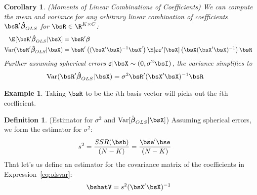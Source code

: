 \documentclass[12pt]{article}
\theoremstyle{plain}
\newtheorem{cor}[thm]{Corollary}
\theoremstyle{definition}
\newtheorem{defn}[thm]{Definition}
\newtheorem{ex}[thm]{Example}
\theoremstyle{remark}
\newcommand{\bsvarepsilon}{\boldsymbol{\varepsilon}}
\newcommand{\bsbeta}{\boldsymbol{\beta}}
\newcommand{\bshatbeta}{\boldsymbol{\hat{\beta}}}
\newcommand{\Var}{\operatorname{Var}}
\begin{document}
\clearpage
\begin{cor}\emph{(Moments of Linear Combinations of Coefficients)}
\label{cor:coeffmoments}
We can compute the mean and variance for any arbitrary linear
combination of coefficients $\bsR'\bshatbeta_{OLS}$ for
$\bsR\in\R^{K\times C}$:
\begin{align*}
  \E[\bsR'\bshatbeta_{OLS}|\bsX]
  &= \bsR'\bsbeta \\
  \Var(\bsR'\bshatbeta_{OLS}|\bsX)
  &=
  \bsR'\left((\bsX'\bsX)^{-1}\bsX'\right)
  \E[\bsvarepsilon\bsvarepsilon' |\bsX]
  \left(\bsX(\bsX'\bsX)^{-1}\right) \bsR
\end{align*}
Further assuming spherical errors
$\bsvarepsilon|\bsX\sim (0,\sigma^2\bsI)$, the variance simplifies to
\begin{align*}
  \Var(\bsR'\bshatbeta_{OLS}|\bsX)
  &=
  \sigma^2\bsR'(\bsX'\bsX)^{-1} \bsR
\end{align*}
\end{cor}
\begin{ex}
Taking $\bsR$ to be the $i$th basis vector will picks out the $i$th
coefficient.
\end{ex}

\begin{defn}(Estimator for $\sigma^2$ and $\Var[\hat{\bsbeta}_{OLS}|\bsX]$)
Assuming spherical errors, we form the estimator for $\sigma^2$:
\begin{align*}
  s^2 &= \frac{SSR(\bsb)}{(N-K)} = \frac{\bse'\bse}{(N-K)}
\end{align*}
That let's us define an estimator for the covariance matrix of the
coefficients in Expression~\ref{eq:olsvar}:
\begin{align*}
  \bshatV
  = s^2(\bsX'\bsX)^{-1}
\end{align*}
\end{defn}
\end{document}
